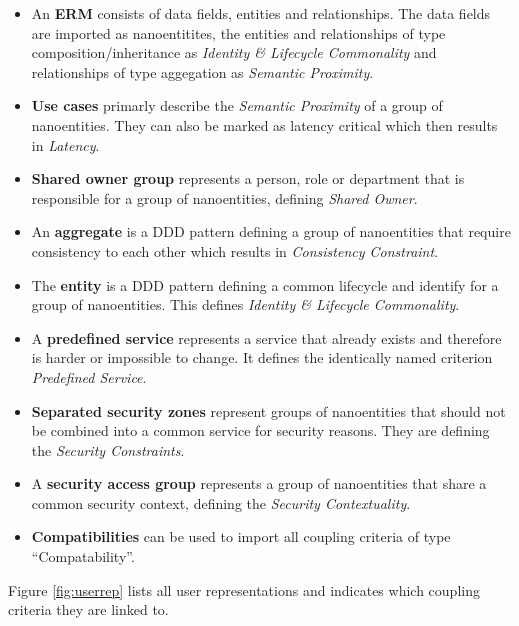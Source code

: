  \begin{itemize}
 	\item An \textbf{\gls{ERM}} consists of data fields, entities and relationships. The data fields are imported as nanoentitites, the entities and relationships of type composition/inheritance as\textit{ Identity \& Lifecycle Commonality} and relationships of type aggegation as \textit{Semantic Proximity}.
 	\item \textbf{Use cases} primarly describe the \textit{Semantic Proximity} of a group of nanoentities. They can also be marked as latency critical which then results in \textit{Latency}.
 	\item \textbf{Shared owner group} represents a person, role or department that is responsible for a group of nanoentities, defining \textit{Shared Owner}.
 	\item An \textbf{aggregate} is a \gls{DDD} pattern defining a group of nanoentities that require consistency to each other which results in \textit{Consistency Constraint}. 
 	\item The \textbf{entity} is a \gls{DDD} pattern defining a common lifecycle and identify for a group of nanoentities. This defines \textit{Identity \& Lifecycle Commonality}.
 	\item A \textbf{predefined service} represents a service that already exists and therefore is harder or impossible to change. It defines the identically named criterion \textit{Predefined Service}.
 	\item \textbf{Separated security zones} represent groups of nanoentities that should not be combined into a common service for security reasons. They are defining the \textit{Security Constraints}.
 	\item A \textbf{security access group} represents a group of nanoentities that share a common security context, defining the \textit{Security Contextuality}.
 	\item \textbf{Compatibilities} can be used to import all coupling criteria of type \enquote{Compatability}.
 \end{itemize}
 
 Figure \ref{fig:userrep} lists all user representations and indicates which coupling criteria they are linked to.
 
